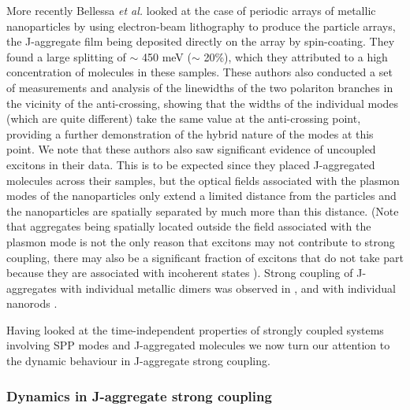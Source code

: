 \documentclass[12pt]{iopart}
\begin{document}
More recently Bellessa {\it et al.} \cite{Bellessa2009} looked at the case of periodic arrays of metallic nanoparticles by using electron-beam lithography to produce the particle arrays, the J-aggregate film being deposited directly on the array by spin-coating. They found a large splitting of $\sim$ 450 meV ($\sim$ 20\%), which they attributed to a high concentration of molecules in these samples. These authors also conducted a set of measurements and analysis of the linewidths of the two polariton branches in the vicinity of the anti-crossing, showing that the widths of the individual modes (which are quite different) take the same value at the anti-crossing point, providing a further demonstration of the hybrid nature of the modes at this point. We note that these authors also saw significant evidence of uncoupled excitons in their data. This is to be expected since they placed J-aggregated molecules across their samples, but the optical fields associated with the plasmon modes of the nanoparticles only extend a limited distance from the particles \cite{Murray_NL_2006_6_1772} and the nanoparticles are spatially separated by much more than this distance. (Note that aggregates being spatially located outside the field associated with the plasmon mode is not the only reason that excitons may not contribute to strong coupling, there may also be a significant fraction of excitons that do not take part because they are associated with incoherent states \cite{Agranovich_PRB_2003_67_085311,Coles_PRB_2011_84_205214}). Strong coupling of J-aggregates with individual metallic dimers was observed in \cite{Schlather2013}, and with individual nanorods \cite{Zengin_SciRep_2013_3_304}.

Having looked at the time-independent properties of strongly coupled systems involving SPP modes and J-aggregated molecules we now turn our attention to the dynamic behaviour in J-aggregate strong coupling.

\subsubsection{Dynamics in J-aggregate strong coupling}  \label{Dynamics}
\end{document}
